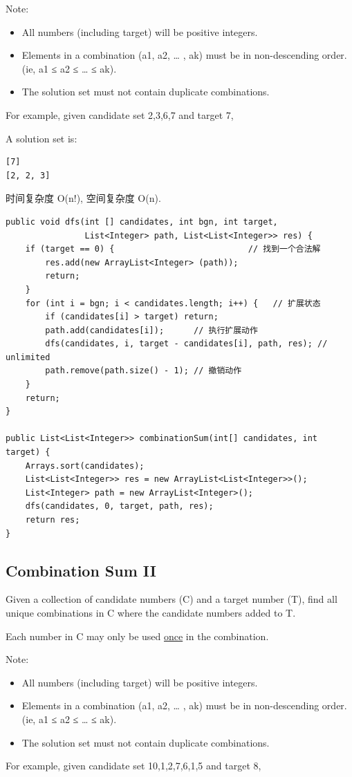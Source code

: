 \documentclass[12pt]{book}
\begin{document}
Note:
\begin{itemize}
\item All numbers (including target) will be positive integers.
\item Elements in a combination (a1, a2, … , ak) must be in non-descending order. (ie, a1 ≤ a2 ≤ … ≤ ak).
\item The solution set must not contain duplicate combinations.
\end{itemize}

For example, given candidate set 2,3,6,7 and target 7, 

A solution set is: 
\lstset{language=java,label= ,caption= ,numbers=none}
\begin{lstlisting}
[7] 
[2, 2, 3]
\end{lstlisting}

时间复杂度 O(n!), 空间复杂度 O(n). 

\lstset{language=java,label= ,caption= ,numbers=none}
\begin{lstlisting}
public void dfs(int [] candidates, int bgn, int target,
                List<Integer> path, List<List<Integer>> res) {
    if (target == 0) {                           // 找到一个合法解
        res.add(new ArrayList<Integer> (path));
        return;
    }
    for (int i = bgn; i < candidates.length; i++) {   // 扩展状态
        if (candidates[i] > target) return;
        path.add(candidates[i]);      // 执行扩展动作
        dfs(candidates, i, target - candidates[i], path, res); // unlimited
        path.remove(path.size() - 1); // 撤销动作
    }
    return;
}
        
public List<List<Integer>> combinationSum(int[] candidates, int target) {
    Arrays.sort(candidates); 
    List<List<Integer>> res = new ArrayList<List<Integer>>();
    List<Integer> path = new ArrayList<Integer>();
    dfs(candidates, 0, target, path, res);
    return res;
}
\end{lstlisting}

\subsection{Combination Sum II}
\label{sec-11-1-5}
Given a collection of candidate numbers (C) and a target number (T), find all unique combinations in C where the candidate numbers added to T.

Each number in C may only be used \uline{once} in the combination.

Note:
\begin{itemize}
\item All numbers (including target) will be positive integers.
\item Elements in a combination (a1, a2, … , ak) must be in non-descending order. (ie, a1 ≤ a2 ≤ … ≤ ak).
\item The solution set must not contain duplicate combinations.
\end{itemize}
For example, given candidate set 10,1,2,7,6,1,5 and target 8, 
\end{document}

